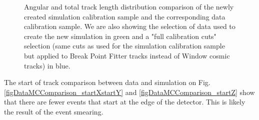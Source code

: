 \documentclass[12pt]{article}
\begin{document}
\begin{figure}[!ht]

\caption{Angular and total track length distribution comparison of the newly created simulation calibration sample and the corresponding data calibration sample. We are also showing the selection of data used to create the new simulation in green and a "full calibration cuts" selection (same cuts as used for the simulation calibration sample but applied to Break Point Fitter tracks instead of Window cosmic tracks) in blue.}
\label{figDataMCComparison_cosZtotLength}
\end{figure}

The start of track comparison between data and simulation on Fig. \ref{figDataMCComparison_startXstartY} and \ref{figDataMCComparison_startZ} show that there are fewer events that start at the edge of the detector. This is likely the result of the event smearing.
\end{document}
